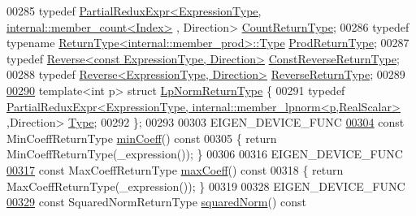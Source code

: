 \begin{DoxyCode}
00285     \textcolor{keyword}{typedef} \hyperlink{group___core___module_class_eigen_1_1_partial_redux_expr}{PartialReduxExpr<ExpressionType, internal::member\_count<Index>}
      , Direction> \hyperlink{group___core___module_class_eigen_1_1_partial_redux_expr}{CountReturnType};
00286     \textcolor{keyword}{typedef} \textcolor{keyword}{typename} \hyperlink{group___core___module_class_eigen_1_1_partial_redux_expr}{ReturnType<internal::member\_prod>::Type} 
      \hyperlink{group___core___module_class_eigen_1_1_partial_redux_expr}{ProdReturnType};
00287     \textcolor{keyword}{typedef} \hyperlink{group___core___module_class_eigen_1_1_reverse}{Reverse<const ExpressionType, Direction>} 
      \hyperlink{group___core___module_class_eigen_1_1_reverse}{ConstReverseReturnType};
00288     \textcolor{keyword}{typedef} \hyperlink{group___core___module_class_eigen_1_1_reverse}{Reverse<ExpressionType, Direction>} 
      \hyperlink{group___core___module_class_eigen_1_1_reverse}{ReverseReturnType};
00289 
\hyperlink{struct_eigen_1_1_vectorwise_op_1_1_lp_norm_return_type}{00290}     \textcolor{keyword}{template}<\textcolor{keywordtype}{int} p> \textcolor{keyword}{struct }\hyperlink{struct_eigen_1_1_vectorwise_op_1_1_lp_norm_return_type}{LpNormReturnType} \{
00291       \textcolor{keyword}{typedef} 
      \hyperlink{group___core___module_class_eigen_1_1_partial_redux_expr}{PartialReduxExpr<ExpressionType, internal::member\_lpnorm<p,RealScalar>}
      ,Direction> \hyperlink{group___core___module_class_eigen_1_1_partial_redux_expr}{Type};
00292     \};
00293 
00303     EIGEN\_DEVICE\_FUNC
\hyperlink{group___core___module_a05f6f60662c06b4987e7eaf747a032c0}{00304}     \textcolor{keyword}{const} MinCoeffReturnType \hyperlink{group___core___module_a05f6f60662c06b4987e7eaf747a032c0}{minCoeff}()\textcolor{keyword}{ const}
00305 \textcolor{keyword}{    }\{ \textcolor{keywordflow}{return} MinCoeffReturnType(\_expression()); \}
00306 
00316     EIGEN\_DEVICE\_FUNC
\hyperlink{group___core___module_a48457cc94227563bca448496aaad8e9c}{00317}     \textcolor{keyword}{const} MaxCoeffReturnType \hyperlink{group___core___module_a48457cc94227563bca448496aaad8e9c}{maxCoeff}()\textcolor{keyword}{ const}
00318 \textcolor{keyword}{    }\{ \textcolor{keywordflow}{return} MaxCoeffReturnType(\_expression()); \}
00319 
00328     EIGEN\_DEVICE\_FUNC
\hyperlink{group___core___module_a6f23ba41822436d3176d718596be8fd0}{00329}     \textcolor{keyword}{const} SquaredNormReturnType \hyperlink{group___core___module_a6f23ba41822436d3176d718596be8fd0}{squaredNorm}()\textcolor{keyword}{ const}

\end{DoxyCode}
